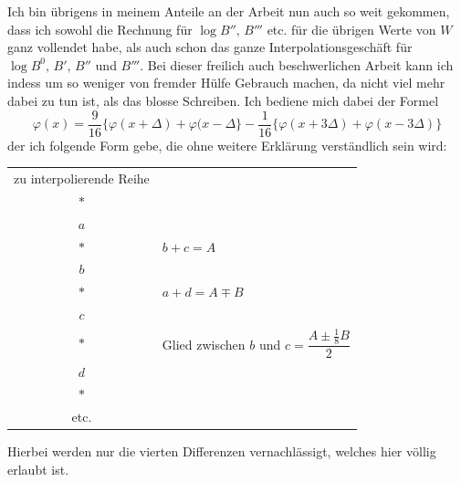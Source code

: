Ich bin übrigens in meinem Anteile an der Arbeit nun auch so weit
gekommen, dass ich sowohl die Rechnung für $\log B'',\,B'''$ etc. für die übrigen
Werte von $W$ ganz vollendet habe, als auch schon das ganze Interpolationsgeschäft
für $\log B^0,\,B',\,B''$ und $B'''$. Bei dieser freilich auch beschwerlichen
Arbeit kann ich indess um so weniger von fremder Hülfe Gebrauch machen,
da nicht viel mehr dabei zu tun ist, als das blosse Schreiben. Ich bediene
mich dabei der Formel
\[
\varphi(x)=\frac{9}{16}\{\varphi(x+\Delta)+\varphi(x-\Delta\}
-\frac{1}{16}\{\varphi(x+3\Delta)+\varphi(x-3\Delta)\}
\]
\noindent der ich folgende Form gebe, die ohne weitere Erklärung verständlich sein
wird:
\clearpage{}
\begin{center}
\begin{tabular}{c@{\qquad}l}
zu interpolierende Reihe&\\
$*$&\\
$a$&\\
$*$&$b+c=A$\\
$b$&\\
$*$&$a+d=A\mp B$\\
$c$&\\
$*$&Glied zwischen $b$ und $c=\dfrac{A\pm\frac{1}{8}B}{2}$\\
$d$&\\
$*$&\\
etc.&
\end{tabular}
\end{center}
\noindent\hspace*{\parindent}Hierbei werden nur die vierten Differenzen vernachlässigt, welches hier
völlig erlaubt ist.

